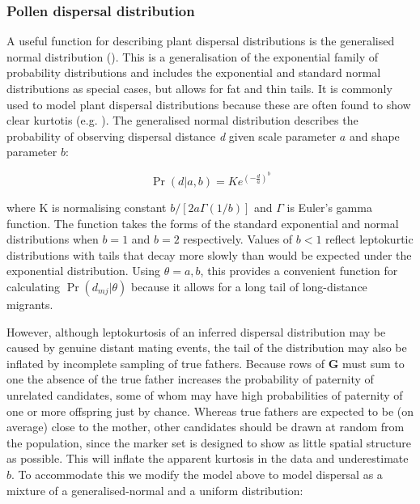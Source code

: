 \documentclass[10pt, a4paper, twocolumn]{article} %
\begin{document}
\subsubsection{Pollen dispersal distribution}

A useful function for describing plant dispersal distributions is the generalised normal distribution (\cite{clark1998trees,Nadarajah2005,kremer2012long}). This is a generalisation of the exponential family of probability distributions and includes the exponential and standard normal distributions as special cases, but allows for fat and thin tails. It is commonly used to model plant dispersal distributions because these are often found to show clear kurtotis (e.g. \cite{austerlitz2004using, robledo2005patterns, klein2008pollen, burczyk2019patterns, field2011importance, ottewell2012pollen}). The generalised normal distribution describes the probability of observing dispersal distance \textit{d} given scale parameter $a$ and shape parameter $b$:

\begin{equation}
\Pr(d|a,b) =K e^{  (-\frac{d}{a} )^b }
\label{eqn:GND}
\end{equation}

where K is normalising constant $b/[2a\Gamma(1/b)]$ and $\Gamma$ is Euler's gamma function. The function takes the forms of the standard exponential and normal distributions when $b=1$ and $b=2$ respectively. Values of $b<1$ reflect leptokurtic distributions with tails that decay more slowly than would be expected under the exponential distribution. Using $\theta={a,b}$, this provides a convenient function for calculating $\Pr(d_{mj} | \theta)$ because it allows for a long tail of long-distance migrants.

However, although leptokurtosis of an inferred dispersal distribution may be caused by genuine distant mating events, the tail of the distribution may also be inflated by incomplete sampling of true fathers. Because rows of \textbf{G} must sum to one the absence of the true father increases the probability of paternity of unrelated candidates, some of whom may have high probabilities of paternity of one or more offspring just by chance. Whereas true fathers are expected to be (on average) close to the mother, other candidates should be drawn at random from the population, since the marker set is designed to show as little spatial structure as possible. This will inflate the apparent kurtosis in the data and underestimate $b$. To accommodate this we modify the model above to model dispersal as a mixture of a generalised-normal and a uniform distribution:
\end{document}
